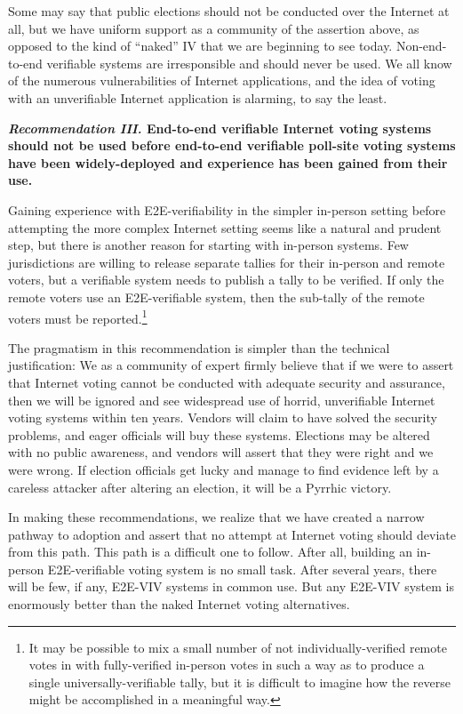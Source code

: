 Some may say that public elections should not be conducted over the
Internet at all, but we have uniform support as a community of the
assertion above, as opposed to the kind of ``naked'' IV that we are
beginning to see today. Non-end-to-end verifiable systems are
irresponsible and should never be used. We all know of the numerous
vulnerabilities of Internet applications, and the idea of voting with
an unverifiable Internet application is alarming, to say the least.

\begin{center}
  \textbf{\emph{Recommendation III.} End-to-end verifiable Internet
    voting systems should not be used before end-to-end verifiable
    poll-site voting systems have been widely-deployed and experience
    has been gained from their use.}
\end{center}

Gaining experience with E2E-verifiability in the simpler in-person
setting before attempting the more complex Internet setting seems like
a natural and prudent step, but there is another reason for starting
with in-person systems.  Few jurisdictions are willing to release
separate tallies for their in-person and remote voters, but a
verifiable system needs to publish a tally to be verified.  If only
the remote voters use an E2E-verifiable system, then the sub-tally of
the remote voters must be reported.\footnote{It may be possible to mix
  a small number of not individually-verified remote votes in with
  fully-verified in-person votes in such a way as to produce a single
  universally-verifiable tally, but it is difficult to imagine how the
  reverse might be accomplished in a meaningful way.}
 
The pragmatism in this recommendation is simpler than the technical
justification: We as a community of expert firmly believe that if we
were to assert that Internet voting cannot be conducted with adequate
security and assurance, then we will be ignored and see widespread use
of horrid, unverifiable Internet voting systems within ten years.
Vendors will claim to have solved the security problems, and eager
officials will buy these systems.  Elections may be altered with no
public awareness, and vendors will assert that they were right and we
were wrong.  If election officials get lucky and manage to find
evidence left by a careless attacker after altering an election, it
will be a Pyrrhic victory.
 
In making these recommendations, we realize that we have created a
narrow pathway to adoption and assert that no attempt at Internet
voting should deviate from this path.  This path is a difficult one to
follow.  After all, building an in-person E2E-verifiable voting system
is no small task.  After several years, there will be few, if any,
E2E-VIV systems in common use.  But any E2E-VIV system is enormously
better than the naked Internet voting alternatives.  

